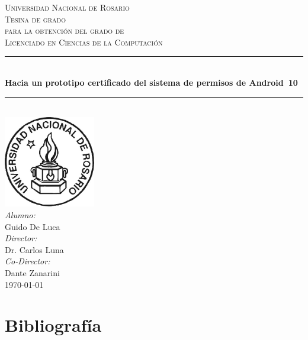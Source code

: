 \documentclass[a4paper]{book}
\begin{document}
\begin{titlepage}

    \newcommand{\HRule}{\rule{\linewidth}{0.5mm}}  %

    \center

    \textsc{\LARGE Universidad Nacional de Rosario} \\[1cm]

    \textsc{\Large Tesina de grado}\\[0.1cm]
    \textsc{\large para la obtención del grado de}\\[0.1cm]
    \textsc{\large Licenciado en Ciencias de la Computación}\\[1cm]

    \HRule \\[0.8cm]
    {\Large \bfseries Hacia un prototipo certificado del sistema de permisos de
    Android~10 }\\[0.7cm]        %
    \HRule \\[1.5cm]


    \large
    \includegraphics[width=0.3\textwidth]{imagenes/unr.jpg}\\[2.5cm] 	%
    \emph{Alumno:}\\
    Guido De Luca \\[0.5cm]
    \emph{Director:}\\
    Dr. Carlos Luna\\[0.5cm]
    \emph{Co-Director:}\\
    Dante Zanarini\\[1.5cm]
    {\large \today}\\[2cm]
    \vfill
\end{titlepage}

\tableofcontents










\chapter*{Bibliografía}
\label{chapter:bib}
\printbibliography[heading=none]
\end{document}
